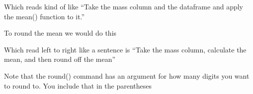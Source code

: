 \documentclass[]{book}
\newenvironment{Shaded}{\begin{snugshade}}{\end{snugshade}}
\newcommand{\KeywordTok}[1]{\textcolor[rgb]{0.13,0.29,0.53}{\textbf{#1}}}
\newcommand{\DataTypeTok}[1]{\textcolor[rgb]{0.13,0.29,0.53}{#1}}
\newcommand{\DecValTok}[1]{\textcolor[rgb]{0.00,0.00,0.81}{#1}}
\newcommand{\StringTok}[1]{\textcolor[rgb]{0.31,0.60,0.02}{#1}}
\newcommand{\OperatorTok}[1]{\textcolor[rgb]{0.81,0.36,0.00}{\textbf{#1}}}
\newcommand{\NormalTok}[1]{#1}
\theoremstyle{definition}
\theoremstyle{definition}
\theoremstyle{definition}
\theoremstyle{remark}
\begin{document}
Which reads kind of like ``Take the mass column and the dataframe and
apply the mean() function to it.''

To round the mean we would do this

\begin{Shaded}
\end{Shaded}

Which read left to right like a sentence is ``Take the mass column,
calculate the mean, and then round off the mean''

Note that the round() command has an argument for how many digits you
want to round to. You include that in the parentheses

\begin{Shaded}
\end{Shaded}
\end{document}
